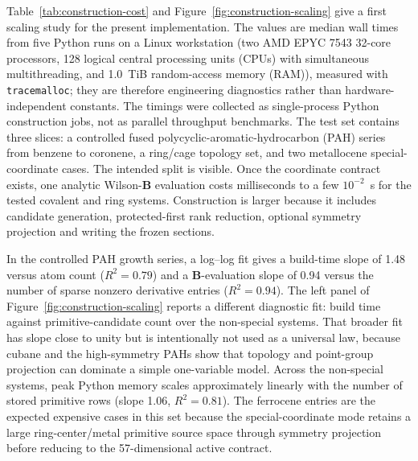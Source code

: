 \documentclass[journal=jctcce,manuscript=article,layout=traditional]{achemso}
\newcommand{\Bmat}{\mathbf{B}}
\theoremstyle{definition}
\begin{document}
Table~\ref{tab:construction-cost} and Figure~\ref{fig:construction-scaling}
give a first scaling study for the present implementation.  The values are
median wall times from five Python runs on a Linux workstation
(two AMD EPYC 7543 32-core processors, 128 logical central processing units
(CPUs) with simultaneous multithreading, and 1.0~TiB random-access memory
(RAM)), measured with
\texttt{tracemalloc}; they are therefore engineering diagnostics rather than
hardware-independent constants.  The timings were collected as single-process
Python construction jobs, not as parallel throughput benchmarks.  The test set
contains three slices: a controlled fused polycyclic-aromatic-hydrocarbon (PAH)
series from benzene to coronene,
a ring/cage topology set, and two metallocene special-coordinate cases.  The
intended split is visible.  Once the coordinate contract exists, one analytic
Wilson-\(\Bmat\) evaluation costs milliseconds to a few \(10^{-2}\)~s for the
tested covalent and ring systems.  Construction is larger because it includes
candidate generation, protected-first rank reduction, optional symmetry
projection and writing the frozen sections.

In the controlled PAH growth series, a log--log fit gives a build-time slope of
1.48 versus atom count (\(R^2=0.79\)) and a \(\Bmat\)-evaluation slope of 0.94
versus the number of sparse nonzero derivative entries (\(R^2=0.94\)).  The
left panel of Figure~\ref{fig:construction-scaling} reports a different
diagnostic fit: build time against primitive-candidate count over the
non-special systems.  That broader fit has slope close to unity but is
intentionally not used as a universal law, because cubane and the high-symmetry
PAHs show that topology and point-group projection can dominate a simple
one-variable model.  Across the non-special systems, peak Python memory scales
approximately linearly with the number of stored primitive rows (slope 1.06,
\(R^2=0.81\)).  The ferrocene entries are the expected expensive
cases in this set because the special-coordinate mode retains a large
ring-center/metal primitive source space through symmetry projection before
reducing to the 57-dimensional active contract.
\end{document}
